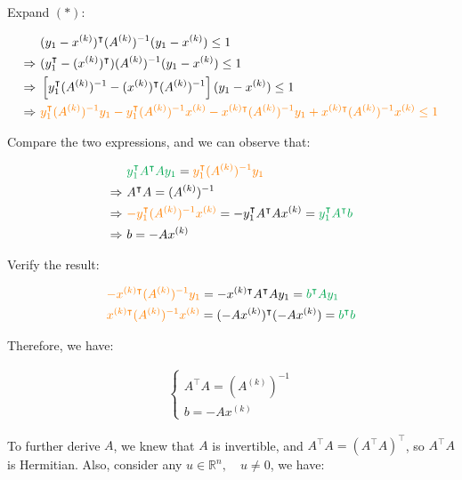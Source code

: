 \documentclass{article}
\begin{document}
Expand $(*)$:

\begin{align*}
    &(y_1 - x^{(k)})^\intercal (A^{(k)})^{-1} (y_1 - x^{(k)}) \le 1 \\
    \Rightarrow \ & (y_1^\intercal - (x^{(k)})^\intercal) (A^{(k)})^{-1} (y_1 - x^{(k)}) \le 1 \\
    \Rightarrow \ & \left[y_1^\intercal(A^{(k)})^{-1} - (x^{(k)})^\intercal(A^{(k)})^{-1}\right] (y_1 - x^{(k)}) \le 1 \\
    \Rightarrow \ & \textcolor{orange}{y_1^\intercal(A^{(k)})^{-1} y_1 - y_1^\intercal(A^{(k)})^{-1} x^{(k)} - x^{(k)\intercal}(A^{(k)})^{-1} y_1 + x^{(k)\intercal}(A^{(k)})^{-1} x^{(k)} \le 1} \\
\end{align*}

Compare the two expressions, and we can observe that:

\begin{align*}
    &\textcolor{Green}{y_1^\intercal A^\intercal Ay_1} = \textcolor{orange}{y_1^\intercal(A^{(k)})^{-1} y_1} \\
    \Rightarrow \ & A^\intercal A = (A^{(k)})^{-1} \\
    \Rightarrow \ & \textcolor{orange}{- y_1^\intercal(A^{(k)})^{-1} x^{(k)}} = - y_1^\intercal A^\intercal A x^{(k)} = \textcolor{Green}{y_1^\intercal A^\intercal b} \\
    \Rightarrow \ & b = -A x^{(k)}
\end{align*}

Verify the result:

\begin{align*}
    &\textcolor{orange}{- x^{(k)\intercal}(A^{(k)})^{-1} y_1} = - x^{(k)\intercal} A^\intercal A y_1 = \textcolor{Green}{b^\intercal A y_1} \\
    &\textcolor{orange}{x^{(k)\intercal}(A^{(k)})^{-1} x^{(k)}} = (-A x^{(k)})^\intercal (-A x^{(k)}) = \textcolor{Green}{b^\intercal b}
\end{align*}

Therefore, we have:

\begin{align*}
    \begin{cases}
        A^\intercal A = (A^{(k)})^{-1} \\
        b = -A x^{(k)}
    \end{cases}
\end{align*}

To further derive $A$, we knew that $A$ is invertible,
and $A^\intercal A = (A^\intercal A)^\intercal$, so $A^\intercal A$ is Hermitian.
Also, consider any $u \in \mathbb{R}^n, \quad u \ne 0$, we have:
\end{document}

